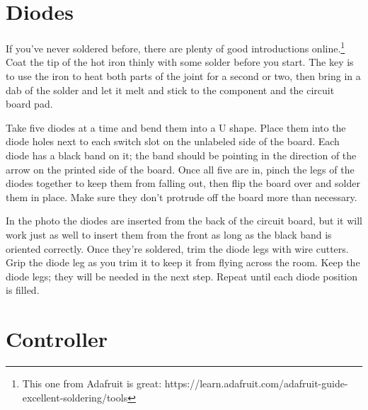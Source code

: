 \documentclass{article}
\begin{document}
\section{Diodes}

If you've never soldered before, there are plenty of good
introductions online.\footnote{This one from Adafruit is great:
  https://learn.adafruit.com/adafruit-guide-excellent-soldering/tools}
Coat the tip of the hot iron thinly with some solder before you
start. The key is to use the iron to heat both parts of the joint for
a second or two, then bring in a dab of the solder and let it melt and
stick to the component and the circuit board pad.

\vspace{1em}

Take five diodes at a time and bend them into a U shape. Place them
into the diode holes next to each switch slot on the unlabeled side of
the board. Each diode has a black band on it; the band should be
pointing in the direction of the arrow on the printed side of the
board. Once all five are in, pinch the legs of the diodes together to
keep them from falling out, then flip the board over and solder them
in place. Make sure they don't protrude off the board more than necessary.

\vspace{1em}
\noindent{}
\vspace{1em}

In the photo the diodes are inserted from the back of the circuit
board, but it will work just as well to insert them from the front as
long as the black band is oriented correctly. Once they're soldered,
trim the diode legs with wire cutters. Grip the diode leg as you
trim it to keep it from flying across the room. Keep the diode legs;
they will be needed in the next step. Repeat until each diode position
is filled.

\section{Controller}
\end{document}

